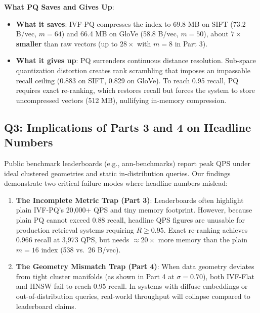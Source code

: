 \documentclass[10pt,twocolumn,a4paper]{article}
\begin{document}
\textbf{What PQ Saves and Gives Up}: 
\begin{itemize}
    \item \textbf{What it saves}: IVF-PQ compresses the index to 69.8 MB on SIFT (73.2 B/vec, $m=64$) and 66.4 MB on GloVe (58.8 B/vec, $m=50$), about \textbf{$7\times$ smaller} than raw vectors (up to $28\times$ with $m=8$ in Part 3).
    \item \textbf{What it gives up}: PQ surrenders continuous distance resolution. Sub-space quantization distortion creates rank scrambling that imposes an impassable recall ceiling (0.883 on SIFT, 0.829 on GloVe). To reach 0.95 recall, PQ requires exact re-ranking, which restores recall but forces the system to store uncompressed vectors (512 MB), nullifying in-memory compression.
\end{itemize}

\subsection{Q3: Implications of Parts 3 and 4 on Headline Numbers}
Public benchmark leaderboards (e.g., ann-benchmarks) report peak QPS under ideal clustered geometries and static in-distribution queries. Our findings demonstrate two critical failure modes where headline numbers mislead:
\begin{enumerate}
    \item \textbf{The Incomplete Metric Trap (Part 3)}: Leaderboards often highlight plain IVF-PQ's 20,000+ QPS and tiny memory footprint. However, because plain PQ cannot exceed 0.88 recall, headline QPS figures are unusable for production retrieval systems requiring $R \ge 0.95$. Exact re-ranking achieves 0.966 recall at 3,973 QPS, but needs $\approx 20\times$ more memory than the plain $m=16$ index (538 vs.\ 26 B/vec).
    \item \textbf{The Geometry Mismatch Trap (Part 4)}: When data geometry deviates from tight cluster manifolds (as shown in Part 4 at $\sigma=0.70$), both IVF-Flat and HNSW fail to reach 0.95 recall. In systems with diffuse embeddings or out-of-distribution queries, real-world throughput will collapse compared to leaderboard claims.
\end{enumerate}
\end{document}
